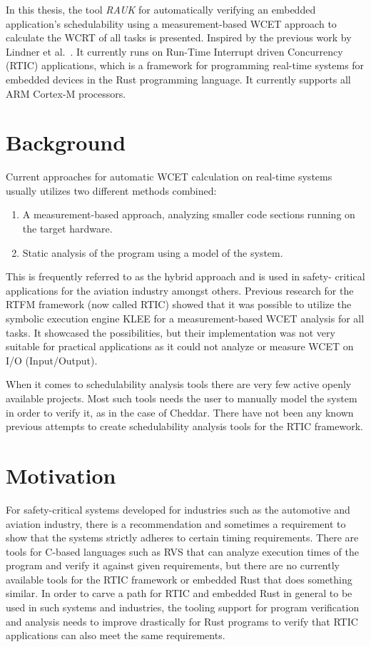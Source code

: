 In this thesis, the tool \emph{RAUK} for automatically verifying an embedded
application's schedulability using a measurement-based WCET approach to
calculate the WCRT of all tasks is presented. Inspired by the previous work by
Lindner et al.\ \cite{lindner}. It currently runs on Run-Time Interrupt driven
Concurrency (RTIC) applications, which is a framework for programming real-time
systems for embedded devices in the Rust programming language. It currently
supports all ARM Cortex-M processors.

\section{Background}
Current approaches for automatic WCET calculation on real-time systems usually
utilizes two different methods combined:
\begin{enumerate}
    \item A measurement-based approach, analyzing smaller code sections running
        on the target hardware.
    \item Static analysis of the program using a model of the system.
\end{enumerate}
This is frequently referred to as the hybrid approach and is used in safety-
critical applications for the aviation industry\cite{rapita} amongst others.
Previous research for the RTFM framework (now called RTIC) showed that it was
possible to utilize the symbolic execution engine KLEE for a measurement-based
WCET analysis for all tasks\cite{lindner}. It showcased the possibilities, but
their implementation was not very suitable for practical applications as it
could not analyze or measure WCET on I/O (Input/Output).

When it comes to schedulability analysis tools there are very few active openly
available projects. Most such tools needs the user to manually model the system
in order to verify it, as in the case of Cheddar\cite{cheddar}. There have not
been any known previous attempts to create schedulability analysis tools for
the RTIC framework.

\section{Motivation}
For safety-critical systems developed for industries such as the automotive and
aviation industry, there is a recommendation and sometimes a requirement to
show that the systems strictly adheres to certain timing requirements. There
are tools for C-based languages such as RVS\cite{rapita} that can analyze
execution times of the program and verify it against given requirements, but
there are no currently available tools for the RTIC framework or embedded Rust
that does something similar. In order to carve a path for RTIC and embedded
Rust in general to be used in such systems and industries, the tooling support
for program verification and analysis needs to improve drastically for Rust
programs to verify that RTIC applications can also meet the same requirements.

